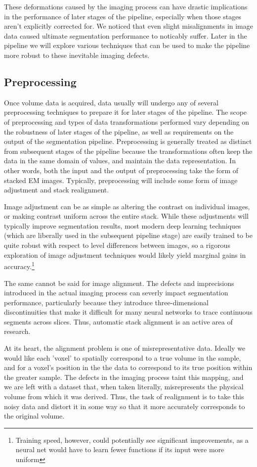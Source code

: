 These deformations caused by the imaging process can have drastic implications in the performance of later stages of the pipeline, especially when those stages aren't explicitly corrected for. We noticed that even slight misalignments in image data caused ultimate segmentation performance to noticably suffer. Later in the pipeline we will explore various techniques that can be used to make the pipeline more robust to these inevitable imaging defects.

\subsection{Preprocessing}
Once volume data is acquired, data usually will undergo any of several preprocessing techniques to prepare it for later stages of the pipeline. The scope of preprocessing and types of data transformations performed vary depending on the robustness of later stages of the pipeline, as well as requirements on the output of the segmentation pipeline. Preprocessing is generally treated as distinct from subsequent stages of the pipeline because the transformations often keep the data in the same domain of values, and maintain the data representation. In other words, both the input and the output of preprocessing take the form of stacked EM images. Typically, preprocessing will include some form of image adjustment and stack realignment.

Image adjustment can be as simple as altering the contrast on individual images, or making contrast uniform across the entire stack. While these adjustments will typically improve segmentation results, most modern deep learning techniques (which are liberally used in the subsequent pipeline stage) are easily trained to be quite robust with respect to level differences between images, so a rigorous exploration of image adjustment techniques would likely yield marginal gains in accuracy.\footnote{Training speed, however, could potentially see significant improvements, as a neural net would have to learn fewer functions if its input were more uniform} 

The same cannot be said for image alignment. The defects and imprecisions introduced in the actual imaging process can severly impact segmentation performance, particularly because they introduce three-dimensional discontinuities that make it difficult for many neural networks to trace continuous segments across slices. Thus, automatic stack alignment is an active area of research.

At its heart, the alignment problem is one of misrepresentative data. Ideally we would like each 'voxel' to spatially correspond to a true volume in the sample, and for a voxel's position in the the data to correspond to its true position within the greater sample. The defects in the imaging process taint this mapping, and we are left with a dataset that, when taken literally, misrepresents the physical volume from which it was derived. Thus, the task of realignment is to take this noisy data and distort it in some way so that it more accurately corresponds to the original volume.

